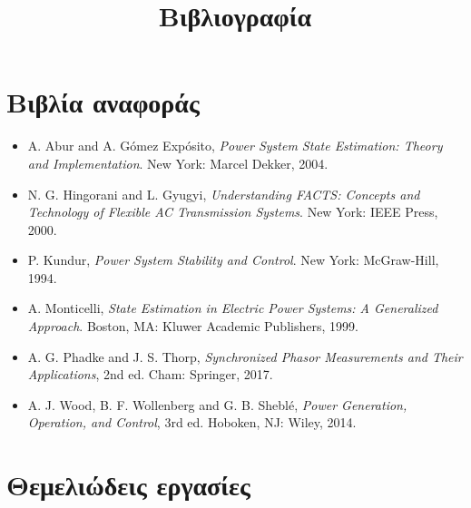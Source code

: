 \title{Βιβλιογραφία}

\section*{Βιβλία αναφοράς}

\begin{itemize}
\item A. Abur and A. Gómez Expósito, \textit{Power System State Estimation: Theory and
      Implementation}. New York: Marcel Dekker, 2004.
\item N. G. Hingorani and L. Gyugyi, \textit{Understanding FACTS: Concepts and Technology of
      Flexible AC Transmission Systems}. New York: IEEE Press, 2000.
\item P. Kundur, \textit{Power System Stability and Control}. New York: McGraw-Hill, 1994.
\item A. Monticelli, \textit{State Estimation in Electric Power Systems: A Generalized
      Approach}. Boston, MA: Kluwer Academic Publishers, 1999.
\item A. G. Phadke and J. S. Thorp, \textit{Synchronized Phasor Measurements and Their
      Applications}, 2nd ed. Cham: Springer, 2017.
\item A. J. Wood, B. F. Wollenberg and G. B. Sheblé, \textit{Power Generation, Operation, and
      Control}, 3rd ed. Hoboken, NJ: Wiley, 2014.
\end{itemize}

\section*{Θεμελιώδεις εργασίες}

